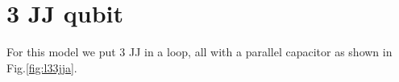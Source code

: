 \section{3 JJ qubit \label{subsec:l33jj}}
For  this  model we  put  3  JJ  in  a loop,  all  with  a  parallel  capacitor as  shown  in
Fig.\ref{fig:l33jja}.
  
  \begin{figure}[h]
    \label{fig:l33jj}
  \end{figure}
  
